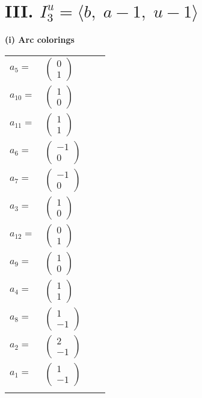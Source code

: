 \documentclass[1p]{elsarticle_modified}
\theoremstyle{definition}
\begin{document}
\centering \section*{III. $I^u_{3}= \langle b,\;a-1,\;u-1 \rangle$}
\flushleft \textbf{(i) Arc colorings}\\
\begin{tabular}{m{7pt} m{180pt} m{7pt} m{180pt} }
\flushright $a_{5}=$&$\begin{pmatrix}0\\1\end{pmatrix}$ \\
\flushright $a_{10}=$&$\begin{pmatrix}1\\0\end{pmatrix}$ \\
\flushright $a_{11}=$&$\begin{pmatrix}1\\1\end{pmatrix}$ \\
\flushright $a_{6}=$&$\begin{pmatrix}-1\\0\end{pmatrix}$ \\
\flushright $a_{7}=$&$\begin{pmatrix}-1\\0\end{pmatrix}$ \\
\flushright $a_{3}=$&$\begin{pmatrix}1\\0\end{pmatrix}$ \\
\flushright $a_{12}=$&$\begin{pmatrix}0\\1\end{pmatrix}$ \\
\flushright $a_{9}=$&$\begin{pmatrix}1\\0\end{pmatrix}$ \\
\flushright $a_{4}=$&$\begin{pmatrix}1\\1\end{pmatrix}$ \\
\flushright $a_{8}=$&$\begin{pmatrix}1\\-1\end{pmatrix}$ \\
\flushright $a_{2}=$&$\begin{pmatrix}2\\-1\end{pmatrix}$ \\
\flushright $a_{1}=$&$\begin{pmatrix}1\\-1\end{pmatrix}$\\&\end{tabular}
\end{document}
